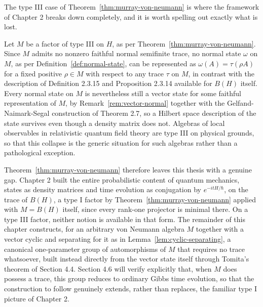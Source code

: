 The type III case of Theorem~\ref{thm:murray-von-neumann} is where the
framework of Chapter 2 breaks down completely, and it is worth spelling
out exactly what is lost.

\begin{remark}\label{rem:type-III-density-matrix}
	Let $M$ be a factor of type III on $H$, as per
	Theorem~\ref{thm:murray-von-neumann}. Since $M$ admits no nonzero
	faithful normal semifinite trace, no normal state $\omega$ on $M$, as
	per Definition~\ref{def:normal-state}, can be represented as
	$\omega(A) = \tau(\rho A)$ for a fixed positive $\rho \in M$ with
	respect to any trace $\tau$ on $M$, in contrast with the description of
	Definition 2.3.15 and Proposition 2.3.14 available for $B(H)$ itself.
	Every normal state on $M$ is nevertheless still a vector state for some
	faithful representation of $M$, by Remark~\ref{rem:vector-normal}
	together with the Gelfand-Naimark-Segal construction of Theorem 2.7,
	so a Hilbert space description of the state survives even though a
	density matrix does not. Algebras of local observables in relativistic
	quantum field theory are type III on physical grounds, so that this
	collapse is the generic situation for such algebras rather than a
	pathological exception. \cite[TODO: collocazione precisa]{TODO-QFTtypeIII}
\end{remark}

Theorem~\ref{thm:murray-von-neumann} therefore leaves this thesis with
a genuine gap. Chapter 2 built the entire probabilistic content of
quantum mechanics, states as density matrices and time evolution as
conjugation by $e^{-itH/\hbar}$, on the trace of $B(H)$, a type I
factor by Theorem~\ref{thm:murray-von-neumann} applied with $M = B(H)$
itself, since every rank-one projector is minimal there. On a type III
factor, neither notion is available in that form. The remainder of
this chapter constructs, for an arbitrary von Neumann algebra $M$
together with a vector cyclic and separating for it as in
Lemma~\ref{lem:cyclic-separating}, a canonical one-parameter group of
automorphisms of $M$ that requires no trace whatsoever, built instead
directly from the vector state itself through Tomita's theorem of
Section 4.4. Section 4.6 will verify explicitly that, when $M$ does
possess a trace, this group reduces to ordinary Gibbs time evolution,
so that the construction to follow genuinely extends, rather than
replaces, the familiar type I picture of Chapter 2.
